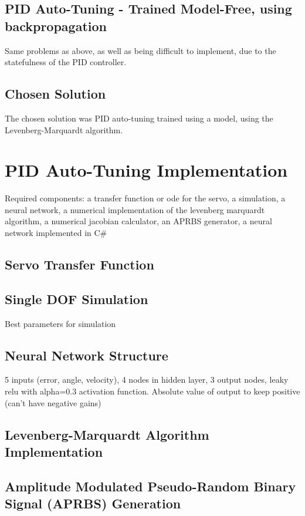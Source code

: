\documentclass[letterpaper,12pt]{article}
\begin{document}
\subsection{PID Auto-Tuning - Trained Model-Free, using backpropagation}
Same problems as above, as well as being difficult to implement, due to the statefulness of the PID controller.

\subsection{Chosen Solution}
The chosen solution was PID auto-tuning trained using a model, using the Levenberg-Marquardt algorithm.

\section{PID Auto-Tuning Implementation}
Required components: a transfer function or ode for the servo, a simulation, a neural network, a numerical implementation of the levenberg marquardt algorithm, a numerical jacobian calculator, an APRBS generator, a neural network implemented in C\#
\subsection{Servo Transfer Function}

\subsection{Single DOF Simulation}
Best parameters for simulation

\subsection{Neural Network Structure}
5 inputs (error, angle, velocity), 4 nodes in hidden layer, 3 output nodes, leaky relu with alpha=0.3 activation function. Absolute value of output to keep positive (can't have negative gains)

\subsection{Levenberg-Marquardt Algorithm Implementation}


\subsection{Amplitude Modulated Pseudo-Random Binary Signal (APRBS) Generation}
\end{document}
